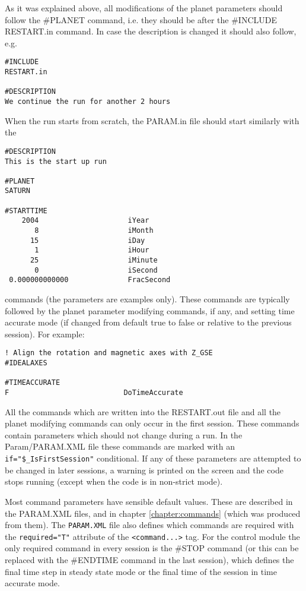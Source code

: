 As it was explained above, all modifications of the planet 
parameters should follow the \#PLANET command, i.e. they should be after 
the \#INCLUDE RESTART.in command. In case the description is
changed it should also follow, e.g.
\begin{verbatim}
#INCLUDE
RESTART.in

#DESCRIPTION
We continue the run for another 2 hours
\end{verbatim}
When the run starts from scratch, the PARAM.in file
should start similarly with the 
\begin{verbatim}
#DESCRIPTION
This is the start up run

#PLANET
SATURN

#STARTTIME
    2004                     iYear
       8                     iMonth
      15                     iDay
       1                     iHour
      25                     iMinute
       0                     iSecond
 0.000000000000              FracSecond
\end{verbatim}
commands (the parameters are examples only).
These commands are typically followed by the planet parameter
modifying commands, if any, and setting time accurate mode
(if changed from default true to false or relative to the previous session).
For example:
\begin{verbatim}
! Align the rotation and magnetic axes with Z_GSE
#IDEALAXES

#TIMEACCURATE
F                           DoTimeAccurate
\end{verbatim}
All the commands which are written into the RESTART.out file and all 
the planet modifying commands can only occur in the first session.
These commands contain parameters which should not change during a run.
In the Param/PARAM.XML file these commands are marked with an 
{\tt if="\$\_IsFirstSession"} conditional.
If any of these parameters are attempted to be changed in later sessions, 
a warning is printed on the screen and the code stops running
(except when the code is in non-strict mode).

Most command parameters have sensible default values.
These are described in the PARAM.XML files,
and in chapter \ref{chapter:commands} (which was produced from them).
The {\tt PARAM.XML} file also defines which commands are required
with the {\tt required="T"} attribute of the {\tt <command...>} tag.
For the control module the only required command in every
session is the \#STOP command
(or this can be replaced with the \#ENDTIME command in the last session), 
which defines the final time step in steady state mode 
or the final time of the session in time accurate mode.

